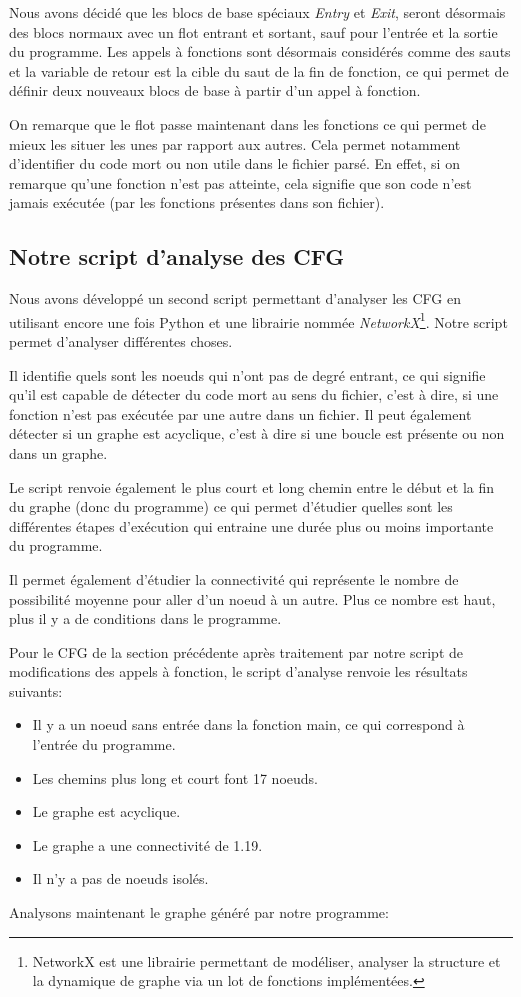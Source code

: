 Nous avons décidé que les blocs de base spéciaux \textit{Entry} et \textit{Exit}, seront désormais des blocs normaux avec un flot entrant et sortant, sauf pour l'entrée et la sortie du programme. Les appels à fonctions sont désormais considérés comme des sauts et la variable de retour est la cible du saut de la fin de fonction, ce qui permet de définir deux nouveaux blocs de base à partir d'un appel à fonction.

On remarque que le flot passe maintenant dans les fonctions ce qui permet de mieux les situer les unes par rapport aux autres. Cela permet notamment d'identifier du code mort ou non utile dans le fichier parsé. En effet, si on remarque qu'une fonction n'est pas atteinte, cela signifie que son code n'est jamais exécutée (par les fonctions présentes dans son fichier).

\subsection{Notre script d'analyse des CFG}
Nous avons développé un second script permettant d'analyser les CFG en utilisant encore une fois Python et une librairie nommée \textit{NetworkX}\footnote{NetworkX est une librairie permettant de modéliser, analyser la structure et la dynamique de graphe via un lot de fonctions implémentées.}. Notre script permet d'analyser différentes choses.

Il identifie quels sont les noeuds qui n'ont pas de degré entrant, ce qui signifie qu'il est capable de détecter du code mort au sens du fichier, c'est à dire, si une fonction n'est pas exécutée par une autre dans un fichier. Il peut également détecter si un graphe est acyclique, c'est à dire si une boucle est présente ou non dans un graphe.

Le script renvoie également le plus court et long chemin entre le début et la fin du graphe (donc du programme) ce qui permet d'étudier quelles sont les différentes étapes d'exécution qui entraine une durée plus ou moins importante du programme.

Il permet également d'étudier la connectivité qui représente le nombre de possibilité moyenne pour aller d'un noeud à un autre. Plus ce nombre est haut, plus il y a de conditions dans le programme.

Pour le CFG de la section précédente après traitement par notre script de modifications des appels à fonction, le script d'analyse renvoie les résultats suivants:
\begin{itemize}
    \item Il y a un noeud sans entrée dans la fonction main, ce qui correspond à l'entrée du programme.
    \item Les chemins plus long et court font 17 noeuds.
    \item Le graphe est acyclique.
    \item Le graphe a une connectivité de 1.19.
    \item Il n'y a pas de noeuds isolés.
\end{itemize}
Analysons maintenant le graphe généré par notre programme:


